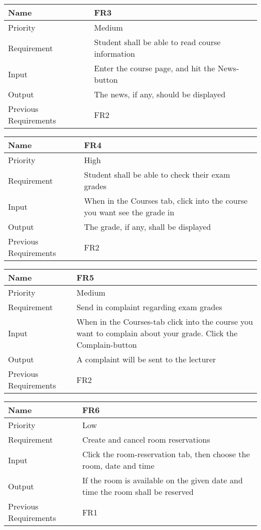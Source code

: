 \begin{tabularx}{\textwidth}{|l|X|}
  \hline
  Name & FR3 \\ \hline
  Priority & Medium \\ \hline
  Requirement & Student shall be able to read course information \\ \hline
  Input & Enter the course page, and hit the News-button \\ \hline
  Output & The news, if any, should be displayed \\ \hline
  Previous Requirements & FR2 \\ \hline
\end{tabularx}

\begin{tabularx}{\textwidth}{|l|X|}
  \hline
  Name & FR4 \\ \hline
  Priority & High \\ \hline
  Requirement & Student shall be able to check their exam grades\\ \hline
  Input & When in the Courses tab, click into the course you want see the grade in \\ \hline
  Output & The grade, if any, shall be displayed \\ \hline
  Previous Requirements & FR2 \\ \hline
\end{tabularx}


\begin{tabularx}{\textwidth}{|l|X|}
  \hline
  Name & FR5 \\ \hline
  Priority & Medium \\ \hline
  Requirement & Send in complaint regarding exam grades \\ \hline
  Input & When in the Courses-tab click into the course you want to complain about your grade. Click the Complain-button \\ \hline
  Output & A complaint will be sent to the lecturer \\ \hline
  Previous Requirements & FR2 \\ \hline
\end{tabularx}

\begin{tabularx}{\textwidth}{|l|X|}
  \hline
  Name & FR6 \\ \hline
  Priority & Low \\ \hline
  Requirement & Create and cancel room reservations \\ \hline
  Input & Click the room-reservation tab, then choose the room, date and time \\ \hline
  Output & If the room is available on the given date and time the room shall be reserved \\ \hline
  Previous Requirements & FR1 \\ \hline
\end{tabularx}

